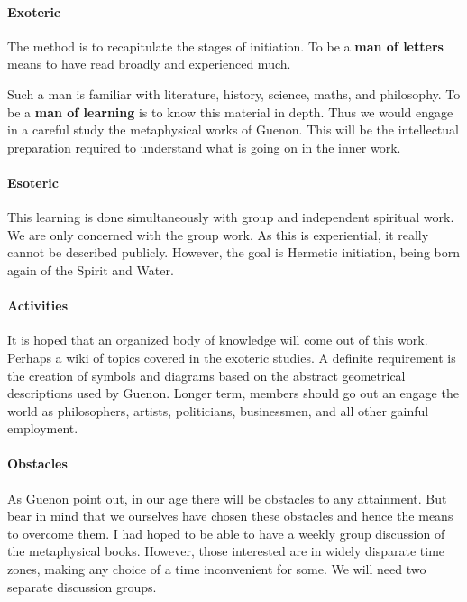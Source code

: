 \paragraph{Exoteric}


The method is to recapitulate the stages of initiation. To be a \textbf{man of letters} means to have read broadly and experienced much.

Such a man is familiar with literature, history, science, maths, and philosophy. To be a \textbf{man of learning} is to know this material in depth. Thus we would engage in a careful study the metaphysical works of Guenon. This will be the intellectual preparation required to understand what is going on in the inner work.

\paragraph{Esoteric}


This learning is done simultaneously with group and independent spiritual work. We are only concerned with the group work. As this is experiential, it really cannot be described publicly. However, the goal is Hermetic initiation, being born again of the Spirit and Water.

\paragraph{Activities}


It is hoped that an organized body of knowledge will come out of this work. Perhaps a wiki of topics covered in the exoteric studies. A definite requirement is the creation of symbols and diagrams based on the abstract geometrical descriptions used by Guenon. Longer term, members should go out an engage the world as philosophers, artists, politicians, businessmen, and all other gainful employment.

\paragraph{Obstacles}


As Guenon point out, in our age there will be obstacles to any attainment. But bear in mind that we ourselves have chosen these obstacles and hence the means to overcome them. I had hoped to be able to have a weekly group discussion of the metaphysical books. However, those interested are in widely disparate time zones, making any choice of a time inconvenient for some. We will need two separate discussion groups.

